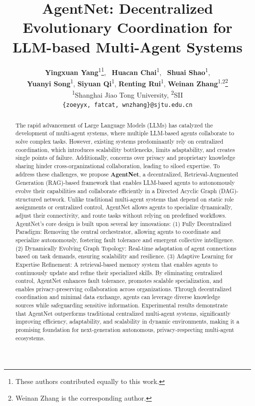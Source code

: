 \documentclass{article}
\title{AgentNet: Decentralized Evolutionary Coordination for LLM-based Multi-Agent Systems}
\date{} 					%
\author{
\normalsize \textbf{Yingxuan Yang}\textsuperscript{1}\thanks{These authors contributed equally to this work.}, 
\normalsize ~\textbf{Huacan Chai}\textsuperscript{1}\footnotemark[1], 
\normalsize ~\textbf{Shuai Shao}\textsuperscript{1}, \\
\normalsize \textbf{Yuanyi Song}\textsuperscript{1}, 
\normalsize \textbf{Siyuan Qi}\textsuperscript{1}, 
\normalsize \textbf{Renting Rui}\textsuperscript{1}, 
\normalsize \textbf{Weinan Zhang}\textsuperscript{1,2}\thanks{Weinan Zhang is the corresponding author.}\\
\normalsize \textsuperscript{1}Shanghai Jiao Tong University, \normalsize \textsuperscript{2}SII\\
\normalsize \texttt{\{zoeyyx, fatcat, wnzhang\}@sjtu.edu.cn}
}
\begin{document}
\maketitle

\begin{abstract} 
The rapid advancement of Large Language Models (LLMs) has catalyzed the development of multi-agent systems, where multiple LLM-based agents collaborate to solve complex tasks.   However, existing systems predominantly rely on centralized coordination, which introduces scalability bottlenecks, limits adaptability, and creates single points of failure.   Additionally, concerns over privacy and proprietary knowledge sharing hinder cross-organizational collaboration, leading to siloed expertise.   To address these challenges, we propose \textbf{AgentNet}, a decentralized, Retrieval-Augmented Generation (RAG)-based framework that enables LLM-based agents to autonomously evolve their capabilities and collaborate efficiently in a Directed Acyclic Graph (DAG)-structured network.   Unlike traditional multi-agent systems that depend on static role assignments or centralized control, AgentNet allows agents to specialize dynamically, adjust their connectivity, and route tasks without relying on predefined workflows.
AgentNet’s core design is built upon several key innovations: (1) Fully Decentralized Paradigm: Removing the central orchestrator, allowing agents to coordinate and specialize autonomously, fostering fault tolerance and emergent collective intelligence. (2) Dynamically Evolving Graph Topology: Real-time adaptation of agent connections based on task demands, ensuring scalability and resilience.
(3) Adaptive Learning for Expertise Refinement: A retrieval-based memory system that enables agents to continuously update and refine their specialized skills.
By eliminating centralized control, AgentNet enhances fault tolerance, promotes scalable specialization, and enables privacy-preserving collaboration across organizations.      Through decentralized coordination and minimal data exchange, agents can leverage diverse knowledge sources while safeguarding sensitive information.      Experimental results demonstrate that AgentNet outperforms traditional centralized multi-agent systems, significantly improving efficiency, adaptability, and scalability in dynamic environments, making it a promising foundation for next-generation autonomous, privacy-respecting multi-agent ecosystems.
\end{abstract}


\end{document}
